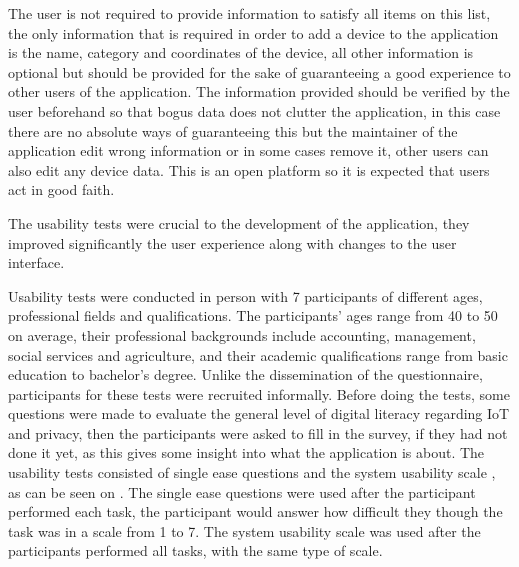 The user is not required to provide information to satisfy all items on this list, the
only information that is required in order to add a device to the application is
the name, category and coordinates of the device, all other
information is optional but should be provided for the sake of guaranteeing a good
experience to other users of the application. The information provided
should be verified by the user beforehand so that bogus data does not clutter
the application, in this case there are no absolute ways of guaranteeing this
but the maintainer of the application edit wrong information or in some
cases remove it, other users can also edit any device data. This is an
open platform so it is expected that users act in good faith.

The usability tests were crucial to the development of the application,
they improved significantly the user experience along with changes to the
user interface.

Usability tests were conducted in person with 7 participants of different
ages, professional fields and qualifications. The participants' ages range
from 40 to 50 on average, their professional backgrounds include accounting,
management, social services and agriculture, and their academic qualifications range from
basic education to bachelor's degree. Unlike the dissemination of the questionnaire,
participants for these tests were recruited informally. Before doing the tests,
some questions were made to evaluate the general level of digital literacy
regarding IoT and privacy, then the participants were asked to fill in the
survey, if they had not done it yet, as this gives some insight into what the
application is about. The usability tests consisted of single ease
questions \cite{tedesco2006comparison}
and the system usability scale \cite{brooke1996sus}, as can be seen on .
The single ease questions were used after the participant performed each task, the
participant would answer how difficult they though the task was in a
scale from 1 to 7. The system usability scale was used after the participants
performed all tasks, with the same type of scale.
